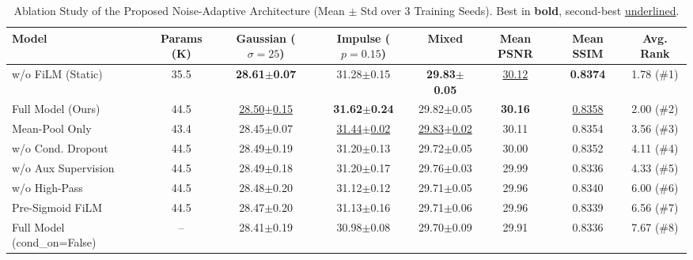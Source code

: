 \begin{table}[t]
\centering
\caption{Ablation Study of the Proposed Noise-Adaptive Architecture (Mean $\pm$ Std over 3 Training Seeds). Best in \textbf{bold}, second-best \underline{underlined}.}
\label{tab:ablation_study}
\setlength{\tabcolsep}{5pt}
\begin{tabular}{lccccccc}
\toprule
Model & Params (K) & Gaussian ($\sigma=25$) & Impulse ($p=0.15$) & Mixed & Mean PSNR & Mean SSIM & Avg. Rank \\
\midrule
w/o FiLM (Static) & 35.5 & \textbf{28.61$\pm$0.07} & 31.28$\pm$0.15 & \textbf{29.83$\pm$0.05} & \underline{30.12} & \textbf{0.8374} & 1.78 (\#1) \\
Full Model (Ours) & 44.5 & \underline{28.50$\pm$0.15} & \textbf{31.62$\pm$0.24} & 29.82$\pm$0.05 & \textbf{30.16} & \underline{0.8358} & 2.00 (\#2) \\
Mean-Pool Only & 43.4 & 28.45$\pm$0.07 & \underline{31.44$\pm$0.02} & \underline{29.83$\pm$0.02} & 30.11 & 0.8354 & 3.56 (\#3) \\
w/o Cond. Dropout & 44.5 & 28.49$\pm$0.19 & 31.20$\pm$0.13 & 29.72$\pm$0.05 & 30.00 & 0.8352 & 4.11 (\#4) \\
w/o Aux Supervision & 44.5 & 28.49$\pm$0.18 & 31.20$\pm$0.17 & 29.76$\pm$0.03 & 29.99 & 0.8336 & 4.33 (\#5) \\
w/o High-Pass & 44.5 & 28.48$\pm$0.20 & 31.12$\pm$0.12 & 29.71$\pm$0.05 & 29.96 & 0.8340 & 6.00 (\#6) \\
Pre-Sigmoid FiLM & 44.5 & 28.47$\pm$0.20 & 31.13$\pm$0.16 & 29.71$\pm$0.06 & 29.96 & 0.8339 & 6.56 (\#7) \\
Full Model (cond\_on=False) & -- & 28.41$\pm$0.19 & 30.98$\pm$0.08 & 29.70$\pm$0.09 & 29.91 & 0.8336 & 7.67 (\#8) \\
\bottomrule
\end{tabular}
\end{table}